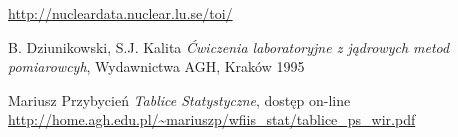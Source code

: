 \documentclass{article}
\begin{document}

\begin{thebibliography}{9}
	
	
	\url{http://nucleardata.nuclear.lu.se/toi/}

	
	B. Dziunikowski, S.J. Kalita
	\emph{Ćwiczenia laboratoryjne z jądrowych metod pomiarowcyh}, Wydawnictwa AGH, Kraków 1995
	
	Mariusz Przybycień \emph{Tablice Statystyczne}, dostęp on-line\\
	\url{http://home.agh.edu.pl/~mariuszp/wfiis_stat/tablice_ps_wir.pdf}
\end{thebibliography}
\vspace{2cm}
\end{document}
